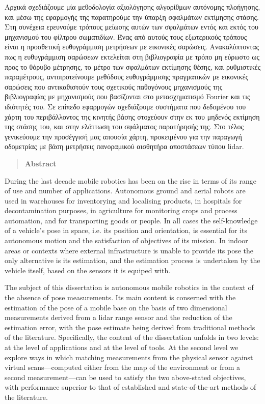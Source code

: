 Αρχικά σχεδιάζουμε μία μεθοδολογία αξιολόγησης αλγορίθμων αυτόνομης πλοήγησης,
και μέσω της εφαρμογής της παρατηρούμε την ύπαρξη σφαλμάτων εκτίμησης στάσης.
Στη συνέχεια ερευνούμε τρόπους μείωσης αυτών των σφαλμάτων εντός και εκτός του
μηχανισμού του φίλτρου σωματιδίων. Ένας από αυτούς τους εξωτερικούς τρόπους
είναι η προσθετική ευθυγράμμιση μετρήσεων με εικονικές σαρώσεις.
Ανακαλύπτοντας πως η ευθυγράμμιση σαρώσεων εκτελείται στη βιβλιογραφία με τρόπο
μη εύρωστο ως προς το θόρυβο μέτρησης, το μέτρο των σφαλμάτων εκτίμησης θέσης,
και ρυθμιστικές παραμέτρους, αντιπροτείνουμε μεθόδους ευθυγράμμισης πραγματικών
με εικονικές σαρώσεις που αντικαθιστούν τους σχετικούς παθογόνους μηχανισμούς
της βιβλιογραφίας με μηχανισμούς που βασίζονται στο μετασχηματισμό Fourier και
τις ιδιότητές του. Σε επίπεδο εφαρμογών σχεδιάζουμε συστήματα που δεδομένου
του χάρτη του περιβάλλοντος της κινητής βάσης στοχεύουν στην εκ του μηδενός
εκτίμηση της στάσης του, και στην ελάττωση του σφάλματος παρατήρησής της. Στο
τέλος γενικεύουμε την προσέγγισή μας απουσία χάρτη, προκειμένου για την
παραγωγή οδομετρίας με βάση μετρήσεις πανοραμικού αισθητήρα αποστάσεων τύπου
lidar.


\newpage

\begin{quotation}
\begin{center}
\textbf{Abstract}
\end{center}
\noindent
\end{quotation}

During the last decade mobile robotics has been on the rise in terms of its
range of use and number of applications. Autonomous ground and aerial robots
are used in warehouses for inventorying and localising products, in hospitals
for decontamination purposes, in agriculture for monitoring crops and process
automation, and for transporting goods or people. In all cases the
self-knowledge of a vehicle's pose in space, i.e. its position and orientation,
is essential for its autonomous motion and the satisfaction of objectives of
its mission. In indoor areas or contexts where external infrastructure is
unable to provide its pose the only alternative is its estimation, and the
estimation process is undertaken by the vehicle itself, based on the sensors it
is equiped with.

The subject of this dissertation is autonomous mobile robotics in the context
of the absence of pose measurements. Its main content is conserned with the
estimation of the pose of a mobile base on the basis of two dimensional
measurements derived from a lidar range sensor and the reduction of the
estimation error, with the pose estimate being derived from traditional methods
of the literature. Specifically, the content of the dissertation unfolds in two
levels: at the level of applications and at the level of tools. At the second
level we explore ways in which matching measurements from the physical sensor
against virtual scans---computed either from the map of the environment or from
a second measurement---can be used to satisfy the two above-stated objectives,
with performance superior to that of established and state-of-the-art methods
of the literature.

